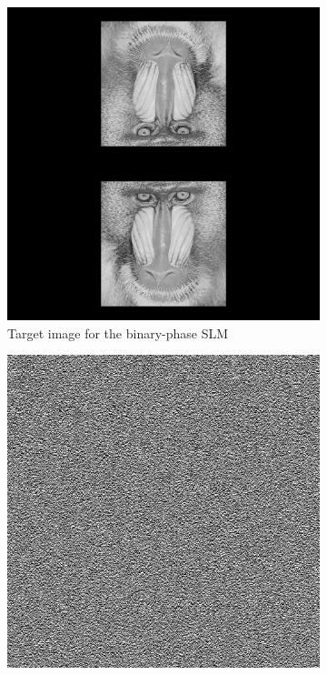 \begin{figure}[H]
  \centering
  \begin{subfigure}[t]{0.3\textwidth}
    \centering
    \includegraphics[width=\textwidth]{mandrill_2.png}
    \caption{Target image for the binary-phase SLM}
    \label{fig:mandrill_2}
  \end{subfigure}
  \hfill
  \begin{subfigure}[t]{0.3\textwidth}
    \centering
    \includegraphics[width=\textwidth]{Naive_binary_Holo.png}

\end{subfigure}
\end{figure}
